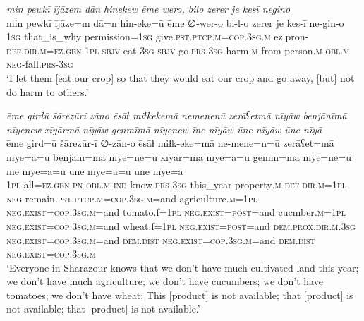 \ea \label{PM.36}
\textit{min pewkī ījāzem dān hinekew ēme wero, bilo zerer je kesī negino} \\ 
\gll min pewkī ījāze=m dā=n hin-eke=ū ēme ∅-wer-o bi-l-o zerer je kes-ī ne-gin-o \\ 
 \textsc{1sg} that\_is\_why permission\textsc{=\textsc{1sg}} give\textsc{.pst}\textsc{.ptcp}\textsc{.m}\textsc{=cop}\textsc{.3sg}\textsc{.m} ez.pron\textsc{-def}\textsc{.dir}\textsc{.m}\textsc{\textsc{=ez.gen}} \textsc{1pl} \textsc{sbjv-}eat\textsc{-3sg} \textsc{sbjv-}go\textsc{.prs}\textsc{-3sg} harm\textsc{.m} from person\textsc{.m}\textsc{-obl}\textsc{.m} \textsc{neg-}fall\textsc{.prs}\textsc{-3sg} \\ 
\glt `I let them [eat our crop] so that they would eat our crop and go away, [but] not do harm to others.'
\z 
 
\ea \label{PM.37}
\textit{ēme girdū šārezūrī zāno ēsāɫ miɫkekemā nemenenū zerāʕetmā nīyāw benjānīmā nīyenew xīyārmā nīyāw genmīmā nīyenew īne nīyāw ūne nīyāw ūne nīyā} \\ 
\gll ēme gird=ū šārezūr-ī ∅-zān-o ēsāɫ miɫk-eke=mā ne-mene=n=ū zerāʕet=mā nīye=ā=ū benjānī=mā nīye=ne=ū xīyār=mā nīye=ā=ū genmī=mā nīye=ne=ū īne nīye=ā=ū ūne nīye=ā=ū ūne nīye=ā \\ 
 \textsc{1pl} all\textsc{\textsc{=ez.gen}} \textsc{pn}\textsc{-obl}\textsc{.m} \textsc{ind-}know\textsc{.prs}\textsc{-3sg} this\_year property\textsc{.m}\textsc{-def}\textsc{.dir}\textsc{.m}\textsc{=1pl} \textsc{neg-}remain\textsc{.pst}\textsc{.ptcp}\textsc{.m}\textsc{=cop}\textsc{.3sg}\textsc{.m}=and agriculture\textsc{.m}\textsc{=1pl} \textsc{\textsc{neg.}exist}\textsc{=cop}\textsc{.3sg}\textsc{.m}=and tomato.f\textsc{=1pl} \textsc{\textsc{neg.}exist}\textsc{=\textsc{post}}=and cucmber\textsc{.m}\textsc{=1pl} \textsc{\textsc{neg.}exist}\textsc{=cop}\textsc{.3sg}\textsc{.m}=and wheat.f\textsc{=1pl} \textsc{\textsc{neg.}exist}\textsc{=\textsc{post}}=and \textsc{dem.prox}\textsc{.dir}\textsc{.m}\textsc{.3sg} \textsc{\textsc{neg.}exist}\textsc{=cop}\textsc{.3sg}\textsc{.m}=and \textsc{dem.dist} \textsc{\textsc{neg.}exist}\textsc{=cop}\textsc{.3sg}\textsc{.m}=and \textsc{dem.dist} \textsc{\textsc{neg.}exist}\textsc{=cop}\textsc{.3sg}\textsc{.m} \\ 
\glt `Everyone in Sharazour knows that we don’t have much cultivated land this year; we don’t have much agriculture; we don’t have cucumbers; we don’t have tomatoes; we don’t have wheat; This [product] is not available; that [product] is not available; that [product] is not available.'
\z 
 
